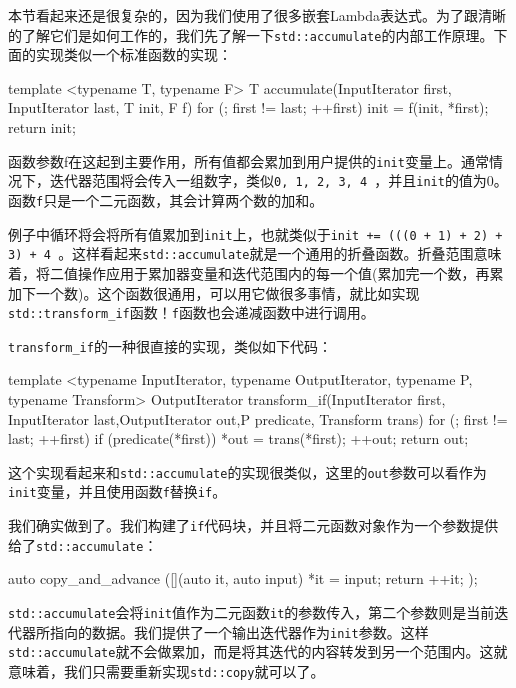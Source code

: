 
本节看起来还是很复杂的，因为我们使用了很多嵌套Lambda表达式。为了跟清晰的了解它们是如何工作的，我们先了解一下\texttt{std::accumulate}的内部工作原理。下面的实现类似一个标准函数的实现：

\begin{codebox}[cpp]
template <typename T, typename F>
T accumulate(InputIterator first, InputIterator last, T init, F f)
{
    for (; first != last; ++first) {
        init = f(init, *first);
    }
    return init;
}
\end{codebox}

函数参数f在这起到主要作用，所有值都会累加到用户提供的\texttt{init}变量上。通常情况下，迭代器范围将会传入一组数字，类似\texttt{0, 1, 2, 3, 4 }，并且\texttt{init}的值为0。函数\texttt{f}只是一个二元函数，其会计算两个数的加和。

例子中循环将会将所有值累加到\texttt{init}上，也就类似于\texttt{init += (((0 + 1) + 2) + 3) + 4 }。这样看起来\texttt{std::accumulate}就是一个通用的折叠函数。折叠范围意味着，将二值操作应用于累加器变量和迭代范围内的每一个值(累加完一个数，再累加下一个数)。这个函数很通用，可以用它做很多事情，就比如实现\texttt{std::transform\_if}函数！\texttt{f}函数也会递减函数中进行调用。

\texttt{transform\_if}的一种很直接的实现，类似如下代码：

\begin{codebox}[cpp]
template <typename InputIterator, typename OutputIterator, typename P, typename Transform>
OutputIterator transform_if(InputIterator first, InputIterator last,OutputIterator out,P predicate, Transform trans)
{
    for (; first != last; ++first) {
        if (predicate(*first)) {
            *out = trans(*first);
            ++out;
        }
    }
    return out;
}
\end{codebox}

这个实现看起来和\texttt{std::accumulate}的实现很类似，这里的\texttt{out}参数可以看作为\texttt{init}变量，并且使用函数\texttt{f}替换\texttt{if}。

我们确实做到了。我们构建了\texttt{if}代码块，并且将二元函数对象作为一个参数提供给了\texttt{std::accumulate}：

\begin{codebox}[cpp]
auto copy_and_advance ([](auto it, auto input) {
    *it = input;
    return ++it;
});
\end{codebox}

\texttt{std::accumulate}会将\texttt{init}值作为二元函数\texttt{it}的参数传入，第二个参数则是当前迭代器所指向的数据。我们提供了一个输出迭代器作为\texttt{init}参数。这样\texttt{std::accumulate}就不会做累加，而是将其迭代的内容转发到另一个范围内。这就意味着，我们只需要重新实现\texttt{std::copy}就可以了。

